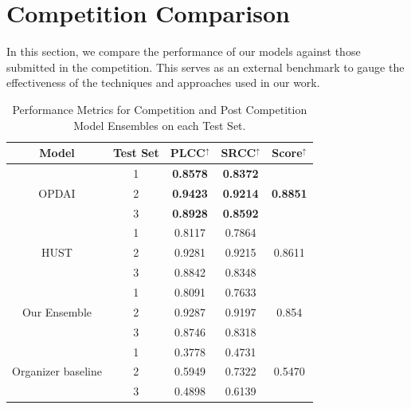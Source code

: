 \documentclass[a4paper,12pt,openright]{book}
\begin{document}
\section{Competition Comparison}
In this section, we compare the performance of our models against those submitted in the competition. This serves as an external benchmark to gauge the effectiveness of the techniques and approaches used in our work. 
\begin{table}[h]

\smallskip
\begin{center}
\begin{tabular}{ | c | c | c | c | c |  }
\hline  
  \textbf{Model} & \textbf{Test Set} & \textbf{PLCC$^{\uparrow}$} & \textbf{SRCC$^{\uparrow}$} & 
  \textbf{Score$^{\uparrow}$}\\ 

\hline
  \multirow{3}{*}{OPDAI} & 1 & \textbf{0.8578} & \textbf{0.8372} &  \multirow{3}{*}{\textbf{0.8851 }} \\
                            & 2 &  \textbf{0.9423}& \textbf{0.9214} & \\
                            & 3 & \textbf{ 0.8928} & \textbf{0.8592} & \\
                             \hline
\multirow{3}{*}{HUST} & 1 & 0.8117 & 0.7864 &  \multirow{3}{*}{0.8611} \\
                            & 2 & 0.9281 &
                            0.9215  &  \\
                            & 3 & 0.8842 & 0.8348&  \\
                            \hline

  \multirow{3}{*}{Our Ensemble} & 1 & 0.8091 & 0.7633  & \multirow{3}{*}{0.854} \\
                            & 2 & 0.9287 &
                            0.9197 & \\
                            & 3 & 0.8746 & 0.8318&  \\
                            \hline

  \multirow{3}{*}{Organizer baseline\cite{sun2023visual}} & 1 & 0.3778 & 0.4731  & \multirow{3}{*}{0.5470} \\
    & 2 & 0.5949 &
    0.7322 & \\
    & 3 & 0.4898 & 0.6139 &  \\
    \hline




\end{tabular}
\end{center}
\caption{Performance Metrics for Competition and Post Competition Model Ensembles on each Test Set.}
\label{res_final}
\end{table}
\end{document}
